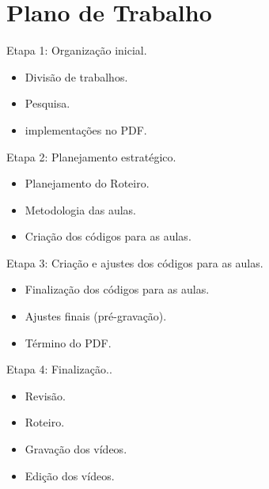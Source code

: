 \documentclass[a4paper,10pt]{article}  %
\begin{document}


\section{Plano de Trabalho}

    Etapa 1: Organização inicial.
    \begin{itemize}
        \item Divisão de trabalhos.
        \item Pesquisa.
        \item implementações no PDF.
    \end{itemize}
     Etapa 2: Planejamento estratégico.
    \begin{itemize}
        \item Planejamento do Roteiro.
        \item Metodologia das aulas.
        \item Criação dos códigos para as aulas.
    \end{itemize}
     Etapa 3: Criação e ajustes dos códigos para as aulas.
    \begin{itemize}
        \item Finalização dos códigos para as aulas.
        \item Ajustes finais (pré-gravação).
        \item Término do PDF.
    \end{itemize}
     Etapa 4: Finalização..
    \begin{itemize}
        \item Revisão.
        \item Roteiro.
        \item Gravação dos vídeos.
        \item Edição dos vídeos.
    \end{itemize}
\end{document}
